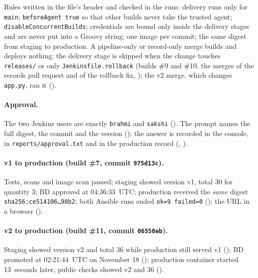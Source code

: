 Rules written in the file's header and checked in the runs: delivery runs only for \texttt{main}; \texttt{beforeAgent true} so that other builds never take the trusted agent;
\texttt{disableConcurrentBuilds}; credentials are bound only inside the delivery stages and are never put into a Groovy string; one image per commit; the same digest from staging to production.
A pipeline-only or record-only merge builds and deploys nothing: the delivery stage is skipped when the change touches \texttt{releases/} or only \texttt{Jenkinsfile.rollback} (builds \#9 and \#10, the merges of the records pull request and of the rollback fix, ); the v2 merge, which changes
\texttt{app.py}, ran it ().

\paragraph{Approval.} The two Jenkins users are exactly \texttt{brahmi} and \texttt{sakshi} (). The prompt names the full digest, the commit and the version (); the answer is recorded in the console, in \texttt{reports/approval.txt} and in the production record (, ).

\paragraph{v1 to production (build \#7, commit \texttt{975d13c}).} Tests, scans and image scan passed; staging showed version v1, total 30 for quantity 3; BD approved at 04:36:33~UTC; production received the \emph{same}
digest \texttt{sha256:ce514106\ldots 98b2}; both Ansible runs ended \texttt{ok=9 failed=0} (); the URL in a browser ().

\paragraph{v2 to production (build \#11, commit \texttt{06550eb}).} Staging showed version v2 and total 36 while production still served v1 (); BD promoted at 02:21:44~UTC on November 18 (); production container started 13~seconds later,
public checks showed v2 and 36 ().

